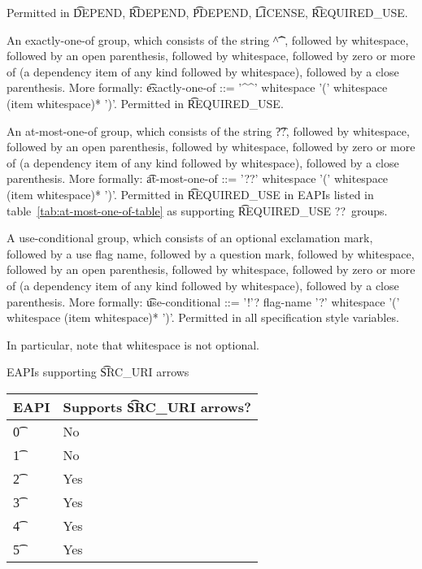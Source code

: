 \begin{compactitem}
    Permitted in \t{DEPEND}, \t{RDEPEND}, \t{PDEPEND}, \t{LICENSE}, \t{REQUIRED\_USE}.
\item An exactly-one-of group, which consists of the string \t{\textasciicircum\textasciicircum},
    followed by whitespace, followed by an open parenthesis, followed by whitespace, followed by
    zero or more of (a dependency item of any kind followed by whitespace), followed by a close
    parenthesis. More formally: \t{exactly-one-of ::= '\textasciicircum\textasciicircum' whitespace
    '(' whitespace (item whitespace)* ')'}.
    Permitted in \t{REQUIRED\_USE}.
\item {} An at-most-one-of group, which consists of the string \t{??},
    followed by whitespace, followed by an open parenthesis, followed by whitespace, followed by
    zero or more of (a dependency item of any kind followed by whitespace), followed by a close
    parenthesis. More formally: \t{at-most-one-of ::= '??' whitespace '(' whitespace (item
    whitespace)* ')'}. Permitted in \t{REQUIRED\_USE} in EAPIs listed in
    table~\ref{tab:at-most-one-of-table} as supporting \t{REQUIRED\_USE ??}\ groups.
\item A use-conditional group, which consists of an optional exclamation mark, followed by
    a use flag name, followed by a question mark, followed by whitespace, followed by
    an open parenthesis, followed by whitespace, followed by zero or more of (a dependency item
    of any kind followed by whitespace), followed by a close parenthesis. More formally:
    \t{use-conditional ::= '!'? flag-name '?' whitespace '(' whitespace (item whitespace)* ')'}.
    Permitted in all specification style variables.
\end{compactitem}

In particular, note that whitespace is not optional.

\begin{centertable}{EAPIs supporting \t{SRC\_URI} arrows} \label{tab:uri-arrows-table}
    \begin{tabular}{ l l }
        \toprule
        \multicolumn{1}{c}{\textbf{EAPI}} &
        \multicolumn{1}{c}{\textbf{Supports \t{SRC\_URI} arrows?}} \\
        \midrule
    \t{0} & No \\
    \t{1} & No \\
    \t{2} & Yes \\
    \t{3} & Yes \\
    \t{4} & Yes \\
    \t{5} & Yes \\
    \bottomrule
    \end{tabular}
\end{centertable}

